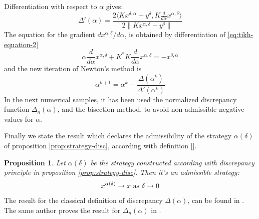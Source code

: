 \documentclass[10pt, a4paper, twoside, openright]{book}
\theoremstyle{definition}
\theoremstyle{plain}
\theoremstyle{plain}
\theoremstyle{plain}
\newtheorem{proposition}[subsection]{Proposition}
\theoremstyle{plain}
\theoremstyle{plain}
\theoremstyle{plain}
\theoremstyle{plain}
\theoremstyle{plain}
\begin{document}
Differentiation with respect to $\alpha$ gives:
\begin{equation}
 \Delta'(\alpha) = \dfrac{2 \langle  Kx^{\delta, \alpha} - y^\delta, K\frac{d}{d\alpha}x^{\alpha, \delta}\rangle}{2\|Kx^{\alpha,\delta} - y^\delta\|}
\end{equation}
The equation for the gradient $dx^{\alpha,\delta}/d\alpha$, is obtained by differentiation of \ref{eq:tikh-equation-2}
\begin{equation}
 \alpha\frac{d}{d\alpha}x^{\alpha, \delta} + K^*K\frac{d}{d\alpha}x^{\alpha, \delta} = -x^{\delta, \alpha}
\end{equation}
and the new iteration of Newton's method is
\begin{equation}
 \alpha^{k+1} = \alpha^k - \frac{\Delta(\alpha^k)}{\Delta'(\alpha^k)}
\end{equation}
In the next numerical samples, it has been used the normalized discrepancy function $\Delta_n(\alpha)$, and the bisection method, to avoid non admissible negative values for $\alpha$.
\par
Finally we state the result which declares the admissibility of the strategy $\alpha(\delta)$ of proposition \ref{prop:strategy-disc}, according with definition \ref{}.
\begin{proposition}
 Let $\alpha(\delta)$ be the strategy constructed according with discrepancy principle in proposition \ref{prop:strategy-disc}. Then it's an admissible strategy:
 \begin{equation}
  x^{\alpha(\delta)}\to x \textup{ as }\delta\to0
 \end{equation}
\end{proposition}
  The result for the classical definition of discrepancy $\Delta(\alpha)$, can be found in \cite{kirsch:book}. The same author proves the result for $\Delta_n(\alpha)$ in \cite{kirsch:shape-1998}.
\end{document}
